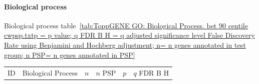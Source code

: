 \paragraph{Biological process}
Biological process table~\ref{tab:ToppGENE GO: Biological Process. bet 90 centile cwpsp.txtp = p value; q FDR B H = q adjusted significance level False Discovery Rate using Benjamini and Hochberg adjustment; n= n genes annotated in test group; n PSP= n genes annotated in PSP}
  \begin{table}[ht]
\centering
\begin{adjustbox}{width=\textwidth}
\setlength{\extrarowheight}{2pt}
\begin{tabular}{@{}clllcl@{}}
  \toprule
  ID & Biological Process & $n$ & $n$ PSP & $p$ & $q$ FDR B H \\ 


\end{tabular}
\end{adjustbox}
\end{table}
